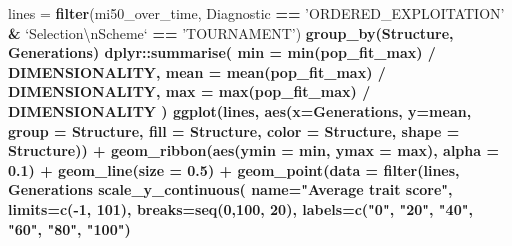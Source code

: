 \documentclass[]{book}
\newenvironment{Shaded}{\begin{snugshade}}{\end{snugshade}}
\newcommand{\CharTok}[1]{\textcolor[rgb]{0.31,0.60,0.02}{#1}}
\newcommand{\DataTypeTok}[1]{\textcolor[rgb]{0.13,0.29,0.53}{#1}}
\newcommand{\DecValTok}[1]{\textcolor[rgb]{0.00,0.00,0.81}{#1}}
\newcommand{\FloatTok}[1]{\textcolor[rgb]{0.00,0.00,0.81}{#1}}
\newcommand{\KeywordTok}[1]{\textcolor[rgb]{0.13,0.29,0.53}{\textbf{#1}}}
\newcommand{\NormalTok}[1]{#1}
\newcommand{\OperatorTok}[1]{\textcolor[rgb]{0.81,0.36,0.00}{\textbf{#1}}}
\newcommand{\StringTok}[1]{\textcolor[rgb]{0.31,0.60,0.02}{#1}}
\begin{document}
\begin{Shaded}
\begin{Highlighting}[]
\NormalTok{lines =}\StringTok{ }\KeywordTok{filter}\NormalTok{(mi50_over_time, Diagnostic }\OperatorTok{==}\StringTok{ 'ORDERED_EXPLOITATION'} \OperatorTok{&}\StringTok{ `}\DataTypeTok{Selection}\CharTok{\textbackslash{}n}\DataTypeTok{Scheme}\StringTok{`} \OperatorTok{==}\StringTok{ 'TOURNAMENT'}\NormalTok{) }\OperatorTok{%>%}
\StringTok{  }\KeywordTok{group_by}\NormalTok{(Structure, Generations) }\OperatorTok{%>%}
\StringTok{  }\NormalTok{dplyr}\OperatorTok{::}\KeywordTok{summarise}\NormalTok{(}
    \DataTypeTok{min =} \KeywordTok{min}\NormalTok{(pop_fit_max) }\OperatorTok{/}\StringTok{ }\NormalTok{DIMENSIONALITY,}
    \DataTypeTok{mean =} \KeywordTok{mean}\NormalTok{(pop_fit_max) }\OperatorTok{/}\StringTok{ }\NormalTok{DIMENSIONALITY,}
    \DataTypeTok{max =} \KeywordTok{max}\NormalTok{(pop_fit_max) }\OperatorTok{/}\StringTok{ }\NormalTok{DIMENSIONALITY}
\NormalTok{  )}
\KeywordTok{ggplot}\NormalTok{(lines, }\KeywordTok{aes}\NormalTok{(}\DataTypeTok{x=}\NormalTok{Generations, }\DataTypeTok{y=}\NormalTok{mean, }\DataTypeTok{group =}\NormalTok{ Structure, }\DataTypeTok{fill =}\NormalTok{ Structure, }\DataTypeTok{color =}\NormalTok{ Structure, }\DataTypeTok{shape =}\NormalTok{ Structure)) }\OperatorTok{+}
\StringTok{  }\KeywordTok{geom_ribbon}\NormalTok{(}\KeywordTok{aes}\NormalTok{(}\DataTypeTok{ymin =}\NormalTok{ min, }\DataTypeTok{ymax =}\NormalTok{ max), }\DataTypeTok{alpha =} \FloatTok{0.1}\NormalTok{) }\OperatorTok{+}
\StringTok{  }\KeywordTok{geom_line}\NormalTok{(}\DataTypeTok{size =} \FloatTok{0.5}\NormalTok{) }\OperatorTok{+}
\StringTok{  }\KeywordTok{geom_point}\NormalTok{(}\DataTypeTok{data =} \KeywordTok{filter}\NormalTok{(lines, Generations }\OperatorTok{%%}\StringTok{ }\DecValTok{2000} \OperatorTok{==}\StringTok{ }\DecValTok{0}\NormalTok{), }\DataTypeTok{size =} \FloatTok{2.5}\NormalTok{, }\DataTypeTok{stroke =} \FloatTok{2.0}\NormalTok{, }\DataTypeTok{alpha =} \FloatTok{1.0}\NormalTok{) }\OperatorTok{+}
\StringTok{  }\KeywordTok{scale_y_continuous}\NormalTok{(}
    \DataTypeTok{name=}\StringTok{"Average trait score"}\NormalTok{,}
    \DataTypeTok{limits=}\KeywordTok{c}\NormalTok{(}\OperatorTok{-}\DecValTok{1}\NormalTok{, }\DecValTok{101}\NormalTok{),}
    \DataTypeTok{breaks=}\KeywordTok{seq}\NormalTok{(}\DecValTok{0}\NormalTok{,}\DecValTok{100}\NormalTok{, }\DecValTok{20}\NormalTok{),}
    \DataTypeTok{labels=}\KeywordTok{c}\NormalTok{(}\StringTok{"0"}\NormalTok{, }\StringTok{"20"}\NormalTok{, }\StringTok{"40"}\NormalTok{, }\StringTok{"60"}\NormalTok{, }\StringTok{"80"}\NormalTok{, }\StringTok{"100"}\NormalTok{)}
}}}
\end{Highlighting}
\end{Shaded}
\end{document}
